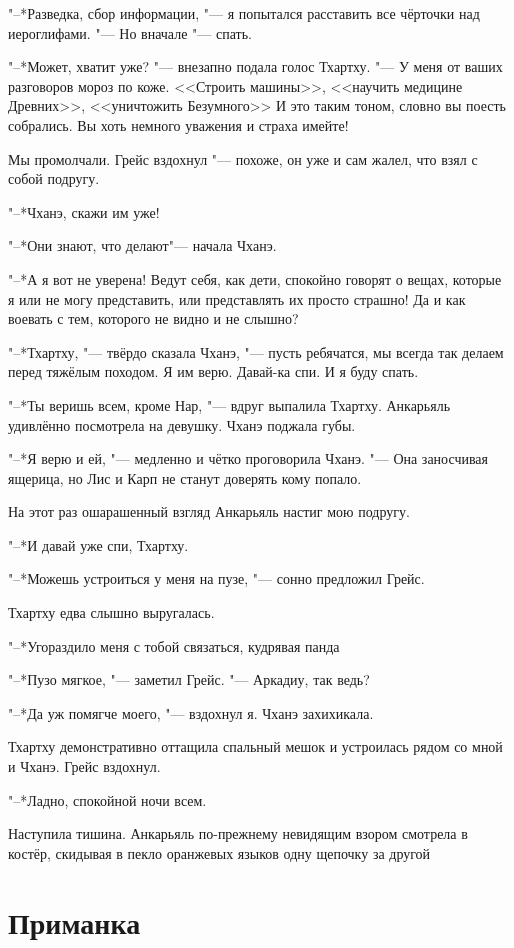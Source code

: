 \documentclass[a4paper,10pt,fleqn]{book}
\newcommand{\ldotst}{\so{...}\xspace}
\begin{document}
"--*Разведка, сбор информации, "--- я попытался расставить все чёрточки над иероглифами.
"--- Но вначале "--- спать.

"--*Может, хватит уже? "--- внезапно подала голос Тхартху.
"--- У меня от ваших разговоров мороз по коже.
<<Строить машины>>, <<научить медицине Древних>>, <<уничтожить Безумного>>\ldotst
И это таким тоном, словно вы поесть собрались.
Вы хоть немного уважения и страха имейте!

Мы промолчали.
Грейс вздохнул "--- похоже, он уже и сам жалел, что взял с собой подругу.

"--*Чханэ, скажи им уже!

"--*Они знают, что делают\ldotst "--- начала Чханэ.

"--*А я вот не уверена!
Ведут себя, как дети, спокойно говорят о вещах, которые я или не могу представить, или представлять их просто страшно!
Да и как воевать с тем, которого не видно и не слышно?

"--*Тхартху, "--- твёрдо сказала Чханэ, "--- пусть ребячатся, мы всегда так делаем перед тяжёлым походом.
Я им верю.
Давай-ка спи.
И я буду спать.

"--*Ты веришь всем, кроме Нар, "--- вдруг выпалила Тхартху.
Анкарьяль удивлённо посмотрела на девушку.
Чханэ поджала губы.

"--*Я верю и ей, "--- медленно и чётко проговорила Чханэ.
"--- Она заносчивая ящерица, но Лис и Карп не станут доверять кому попало.

На этот раз ошарашенный взгляд Анкарьяль настиг мою подругу.

"--*И давай уже спи, Тхартху.

"--*Можешь устроиться у меня на пузе, "--- сонно предложил Грейс.

Тхартху едва слышно выругалась.

"--*Угораздило меня с тобой связаться, кудрявая панда\ldotst

"--*Пузо мягкое, "--- заметил Грейс.
"--- Аркадиу, так ведь?

"--*Да уж помягче моего, "--- вздохнул я.
Чханэ захихикала.

Тхартху демонстративно оттащила спальный мешок и устроилась рядом со мной и Чханэ.
Грейс вздохнул.

"--*Ладно, спокойной ночи всем.

Наступила тишина.
Анкарьяль по-прежнему невидящим взором смотрела в костёр, скидывая в пекло оранжевых языков одну щепочку за другой\ldotst

\section{Приманка}
\end{document}
